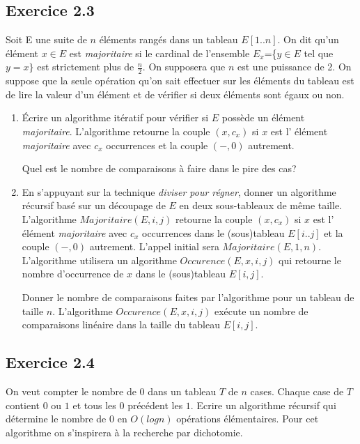 \documentclass{article}[12pt]
\begin{document}
\subsection*{Exercice 2.3} 
Soit E une suite de $n$ éléments rangés dans un tableau $E[1..n]$. On dit qu’un élément $x\in E$ est \emph{majoritaire} si le cardinal de l'ensemble $E_x$=\{$y\in E$ tel que $y=x\}$ est strictement plus de $\frac{n}{2}$. On supposera que $n$ est une puissance de 2. 
On suppose que la seule opération qu’on sait effectuer sur les éléments du tableau est de lire la valeur d'un élément et de vérifier si deux éléments sont égaux ou non.
\begin{enumerate}
\item \'Ecrire un algorithme itératif pour vérifier si $E$ possède un élément \emph{majoritaire}. L'algorithme retourne la couple $(x,c_x)$ si $x$ est l' élément \emph{majoritaire} avec $c_x$ occurrences et la couple $(-,0)$ autrement.

Quel est le nombre de comparaisons à faire dans le pire des cas?

\item En s'appuyant sur la technique \emph{diviser pour régner}, donner un algorithme récursif basé sur un découpage de $E$ en deux sous-tableaux de même taille. L'algorithme $Majoritaire(E,i,j)$ retourne la couple $(x,c_x)$ si $x$ est l' élément \emph{majoritaire} avec $c_x$ occurrences dans le (sous)tableau $E[i..j]$ et la couple $(-,0)$ autrement. L'appel initial sera $Majoritaire(E,1,n)$. L'algorithme utilisera un algorithme $Occurence(E,x,i,j)$ qui retourne le nombre d'occurrence de $x$ dans le (sous)tableau $E[i,j]$.

Donner le nombre de comparaisons faites par l'algorithme pour un tableau de taille $n$. L'algorithme $Occurence(E,x,i,j)$ exécute un nombre de comparaisons linéaire dans la taille du tableau $E[i,j]$.

\end{enumerate}

\subsection*{Exercice 2.4} On veut compter le nombre de $0$ dans un tableau $T$ de $n$ cases. Chaque case de $T$ contient $0$ ou $1$ et tous les $0$ précédent les $1$. Ecrire un algorithme récursif qui détermine le nombre de $0$ en $O(logn)$ opérations élémentaires. Pour cet algorithme on s'inspirera à la recherche par dichotomie.
\end{document}
